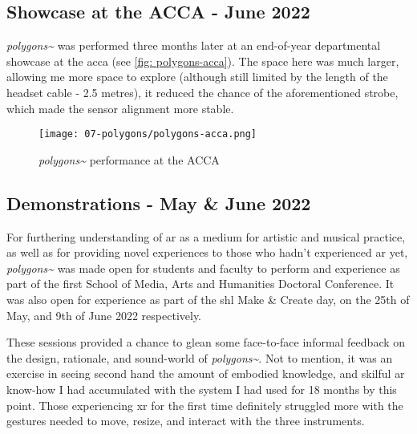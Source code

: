 \subsection{Showcase at the ACCA - June 2022}\label{sec: polygons-performances-acca}
\textit{polygons\textasciitilde{}} was performed three months later at an end-of-year departmental showcase at the \gls{acca} (see \autoref{fig: polygons-acca}). The space here was much larger, allowing me more space to explore (although still limited by the length of the headset cable - 2.5 metres), it reduced the chance of the aforementioned strobe, which made the sensor alignment more stable.

\begin{figure}
    \centering
    \texttt{[image: 07-polygons/polygons-acca.png]}
    \caption{\textit{polygons\textasciitilde{}} performance at the ACCA}
    \label{fig: polygons-acca}
\end{figure}

\subsection{Demonstrations - May \& June 2022}\label{sec: polygons-performances-demos}
For furthering understanding of \gls{ar} as a medium for artistic and musical practice, as well as for providing novel experiences to those who hadn't experienced \gls{ar} yet, \textit{polygons\textasciitilde{}} was made open for students and faculty to perform and experience as part of the first School of Media, Arts and Humanities Doctoral Conference. It was also open for experience as part of the \gls{shl} Make \& Create day, on the 25th of May, and 9th of June 2022 respectively.

These sessions provided a chance to glean some face-to-face informal feedback on the design, rationale, and sound-world of \textit{polygons\textasciitilde{}}. Not to mention, it was an exercise in seeing second hand the amount of embodied knowledge, and skilful \gls{ar} know-how I had accumulated with the system I had used for 18 months by this point. Those experiencing \gls{xr} for the first time definitely struggled more with the gestures needed to move, resize, and interact with the three instruments.



